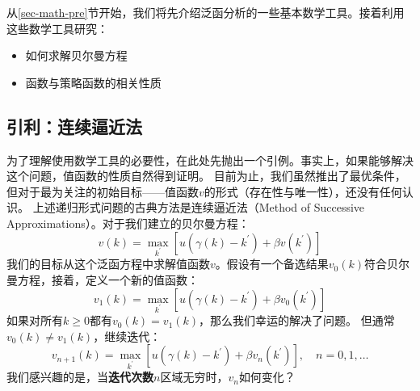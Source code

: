 从\ref{sec-math-pre}节开始，我们将先介绍泛函分析的一些基本数学工具。接着利用这些数学工具研究：
\begin{itemize}
    \item 如何求解贝尔曼方程
    \item 函数与策略函数的相关性质
\end{itemize}


\subsection{引利：连续逼近法}

为了理解使用数学工具的必要性，在此处先抛出一个引例。事实上，如果能够解决这个问题，值函数的性质自然得到证明。
目前为止，我们虽然推出了最优条件，但对于最为关注的初始目标——值函数$v$的形式（存在性与唯一性），还没有任何认识。
上述递归形式问题的古典方法是连续逼近法（Method of Successive Approximations）。对于我们建立的贝尔曼方程：
\begin{equation*}
    v\left(k\right)=\max_{k^{\prime}}
        \left[u\left(\gamma\left(k\right)-k^{\prime}\right)+\beta v\left(k^{\prime}\right)\right]
\end{equation*}
我们的目标从这个泛函方程中求解值函数$v$。假设有一个备选结果$v_0\left(k\right)$符合贝尔曼方程，接着，定义一个新的值函数：
\begin{equation*}
    v_1\left(k\right) = \max_{k^{\prime}}
        \left[u\left(\gamma\left(k\right)-k^{\prime}\right)+\beta v_0\left(k^{\prime}\right)\right]
\end{equation*}
如果对所有$k\geq 0$都有$v_0\left(k\right)=v_1\left(k\right)$，那么我们幸运的解决了问题。
但通常$v_0\left(k\right) \neq v_1\left(k\right)$，继续迭代：
\begin{equation*}
    v_{n+1}\left(k\right) = \max _{k^{\prime}}
        \left[u\left(\gamma\left(k\right)-k^{\prime}\right)+\beta v_n\left(k^{\prime}\right)\right],\quad n = 0,1,\dots
\end{equation*}
我们感兴趣的是，当\textbf{迭代次数}$n$区域无穷时，$v_n$如何变化？

